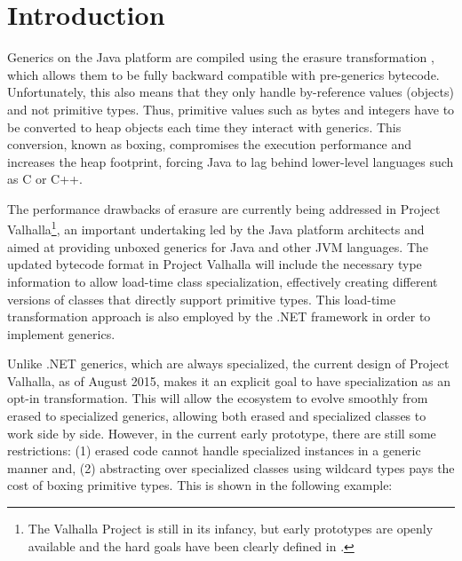 \section{Introduction}
\label{mbox2:sec:intro}

Generics on the Java platform are compiled using the erasure transformation \cite{java-erasure}, which allows them to be fully backward compatible with pre-generics bytecode. Unfortunately, this also means that they only handle by-reference values (objects) and not primitive types. Thus, primitive values such as bytes and integers have to be converted to heap objects each time they interact with generics. This conversion, known as boxing, compromises the execution performance and increases the heap footprint, forcing Java to lag behind lower-level languages such as C or C++.

The performance drawbacks of erasure are currently being addressed in Project Valhalla\footnote{The Valhalla Project is still in its infancy, but early prototypes are openly available and the hard goals have been clearly defined in \cite{goetz-specialization, rose-value-classes-tearing, rose-value-classes-vm}.}, an important undertaking led by the Java platform architects and aimed at providing unboxed generics for Java and other JVM languages. The updated bytecode format in Project Valhalla will include the necessary type information to allow load-time class specialization, effectively creating different versions of classes that directly support primitive types. This load-time transformation approach is also employed by the .NET framework \cite{dot-net-generics,dot-net-generics-form} in order to implement generics.

Unlike .NET generics, which are always specialized, the current design of Project Valhalla, as of August 2015, makes it an explicit goal to have specialization as an opt-in transformation. This will allow the ecosystem to evolve smoothly from erased to specialized generics, allowing both erased and specialized classes to work side by side. However, in the current early prototype, there are still some restrictions: (1) erased code cannot handle specialized instances in a generic manner and, (2) abstracting over specialized classes using wildcard types \cite{valhalla-model2-announcement,valhalla-model2-implementation} pays the cost of boxing primitive types. This is shown in the following example:

